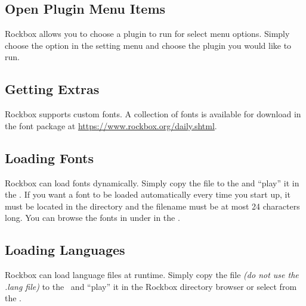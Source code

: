 \subsection{\label{ref:OpenPlugins}Open Plugin Menu Items}

Rockbox allows you to choose a plugin to run for select menu options.
Simply choose the option in the setting menu and choose the plugin
you would like to run.

\subsection{\label{ref:GettingExtras}Getting Extras}

Rockbox supports custom fonts. A collection of fonts is available for download
in the font package at \url{https://www.rockbox.org/daily.shtml}.

\subsection{\label{ref:Loadingfonts}Loading Fonts}
Rockbox can load fonts dynamically. Simply copy the  file to the
\dap{} and ``play'' it in the . If you want a font to
be loaded automatically every time you start up, it must be located in the
 directory and the filename must be at most 24 characters
long. You can browse the fonts in  under
in the .\\


\subsection{\label{ref:Loadinglanguages}Loading Languages}
%
Rockbox can load language files at runtime. Simply copy the  file
\emph{(do not use the .lang file)} to the \dap\ and ``play'' it in the
Rockbox directory browser or select from the .\\

